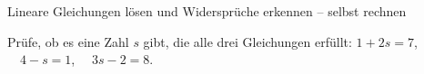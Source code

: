 \begin{aufgabe}{Lineare Gleichungen lösen und Widersprüche erkennen – selbst rechnen}
\begin{teile}
\teil Prüfe, ob es eine Zahl $s$ gibt, die alle drei Gleichungen erfüllt: $1 + 2s = 7$, $\quad 4 - s = 1$, $\quad 3s - 2 = 8$.
\end{teile}
\end{aufgabe}

